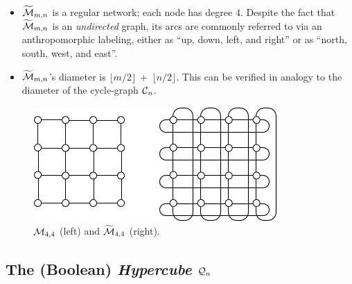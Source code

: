 \begin{itemize}
\begin{itemize}
  \item
$\widetilde{\mbox{$\cal M$}}_{m,n}$ is a regular network; each node has degree $4$.
    Despite the fact that $\widetilde{\mbox{$\cal M$}}_{m,n}$ is an {\em
      undirected} graph, its arcs are commonly referred to via an
    anthropomorphic labeling, either as ``up, down, left, and right''
    or as ``north, south, west, and east''.
  \item {}
$\widetilde{\mbox{$\cal M$}}_{m,n}$'s diameter is $\lfloor m/2 \rfloor \ + \
\lfloor n/2 \rfloor$.  This can be verified in analogy to the diameter
of the cycle-graph $\mbox{$\cal C$}_n$.
\end{itemize}
\end{itemize}

\begin{figure}[hbt]
\begin{center}
       \includegraphics[scale=0.6]{FiguresGraph/meshtorus}
       \caption{$\mbox{$\cal M$}_{4,4}$ (left) and $\widetilde{\mbox{$\cal M$}}_{4,4}$ (right).}
  \label{fig:torus}
\end{center}
\end{figure}

\subsection{The (Boolean) {\it Hypercube} $\mbox{$\cal Q$}_n$}
\label{sec:hypercube}


